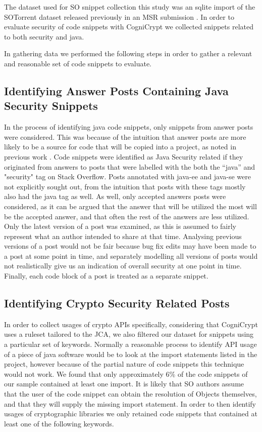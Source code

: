 \documentclass[10pt, conference]{IEEEtran}
\begin{document}
The dataset used for SO snippet collection this study was an sqlite import \cite{wong_2019} of the SOTorrent dataset released previously in an MSR submission \cite{DBLP:conf/msr/BaltesDT008}. In order to evaluate security of code snippets with CogniCrypt we collected snippets related to both security and java. 

In gathering data we performed the following steps in order to gather a relevant and reasonable set of code snippets to evaluate.

\subsection{Identifying Answer Posts Containing Java Security Snippets}
In the process of identifying java code snippets, only snippets from answer posts were considered. This was because of the intuition that answer posts are more likely to be a source for code that will be copied into a project, as noted in previous work \cite{7958574}. Code snippets were identified as Java Security related if they originated from answers to posts that were labelled with the both the “java” and "security" tag on Stack Overflow. Posts annotated with java-ee and java-se were not explicitly sought out, from the intuition that posts with these tags mostly also had the java tag as well. As well, only accepted answers posts were considered, as it can be argued that the answer that will be utilized the most will be the accepted answer, and that often the rest of the answers are less utilized. Only the latest version of a post was examined, as this is assumed to fairly represent what an author intended to share at that time. Analysing previous versions of a post would not be fair because bug fix edits may have been made to a post at some point in time, and separately modelling all versions of posts would not realistically give us an indication of overall security at one point in time. Finally, each code block of a post is treated as a separate snippet.  


\subsection{Identifying Crypto Security Related Posts}
In order to collect usages of crypto APIs specifically, considering that CogniCrypt uses a ruleset tailored to the JCA, we also filtered our dataset for snippets using a particular set of keywords. 
Normally a reasonable process to identify API usage of a piece of java software would be to look at the import statements listed in the project, however because of the partial nature of code snippets this technique would not work. We found that only approximately 6\% of the code snippets of our sample contained at least one import. It is likely that SO authors assume that the user of the code snippet can obtain the resolution of Objects themselves, and that they will supply the missing import statement.
In order to then identify usages of cryptographic libraries we only retained code snippets that contained at least one of the following keywords.
\end{document}
